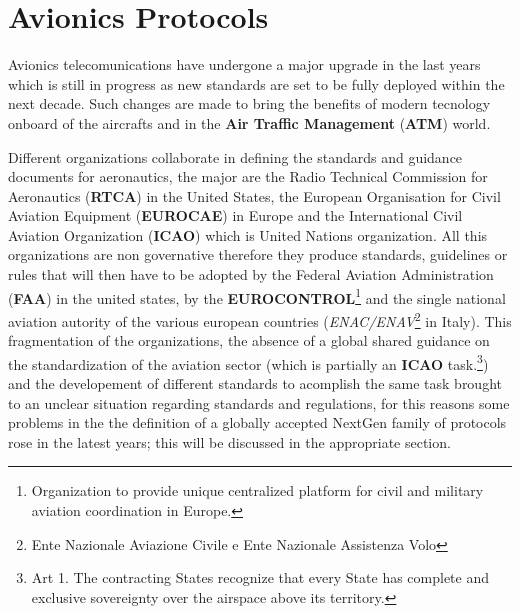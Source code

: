 \documentclass[../main.tex]{subfiles}
\begin{document}
\chapter{Avionics Protocols}
\label{chap:avionicsprot}

Avionics telecomunications have undergone a major upgrade in the last years
which is still in progress as new standards are set to be fully deployed within
the next decade. Such changes are made to bring the benefits of modern tecnology
onboard of the aircrafts and in the \textbf{Air Traffic Management}
(\textbf{ATM}) world.

Different organizations collaborate in defining the standards and guidance
documents for aeronautics, the major are the Radio Technical Commission for
Aeronautics (\textbf{RTCA}) in the United States, the European Organisation for
Civil Aviation Equipment (\textbf{EUROCAE}) in Europe and the International
Civil Aviation Organization (\textbf{ICAO}) which is United Nations
organization. All this organizations are non governative therefore they produce
standards, guidelines or rules that will then have to be adopted by the Federal
Aviation Administration (\textbf{FAA}) in the united states, by the
\textbf{EUROCONTROL}\footnote{Organization to provide unique centralized
platform for civil and military aviation coordination in Europe.} and the single
national aviation autority of the various european countries
(\textit{ENAC/ENAV}\footnote{Ente Nazionale Aviazione Civile e Ente Nazionale
Assistenza Volo} in Italy). This fragmentation of the organizations, the
absence of a global shared guidance on the standardization of the aviation
sector (which is partially an \textbf{ICAO} task.\footnote{Art 1. The
contracting States recognize that every  State has complete and exclusive
sovereignty over the airspace above its territory.\cite{icao7300}}) and the
developement of different standards to acomplish the same task brought to an
unclear situation regarding standards and regulations, for this reasons some
problems in the the definition of a globally accepted NextGen family of
protocols rose in the latest years; this will be discussed in the appropriate
section.

\end{document}

